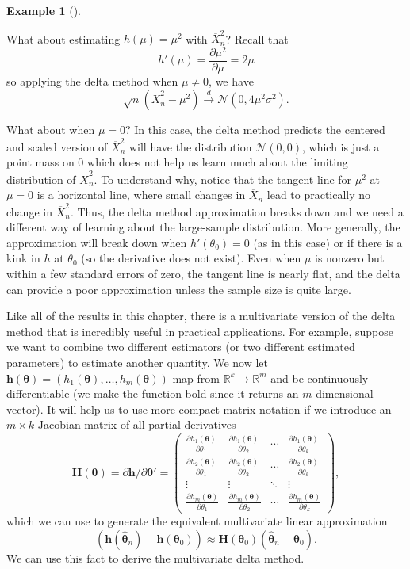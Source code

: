 \documentclass[
  13pt,
  letterpaper,
  DIV=11,
  numbers=noendperiod]{scrreprt}
\newcommand{\mb}{\bm}
\newcommand{\N}{\mathcal{N}}
\newcommand{\Xbar}{\overline{X}}
\newcommand{\indist}{\overset{d}{\to}}
\theoremstyle{plain}
\theoremstyle{plain}
\theoremstyle{definition}
\theoremstyle{definition}
\newtheorem{example}{Example}[chapter]
\theoremstyle{remark}
\begin{document}
\begin{example}[]\protect\hypertarget{exm-squared}{}\label{exm-squared}

What about estimating \(h(\mu) =\mu^2\) with \(\Xbar_n^2\)? Recall that
\[
h'(\mu) = \frac{\partial \mu^2}{\partial \mu} = 2\mu
\] so applying the delta method when \(\mu \neq 0\), we have \[
\sqrt{n}\left(\Xbar_n^2 - \mu^2\right) \indist \N(0, 4\mu^2\sigma^2).
\]

What about when \(\mu = 0\)? In this case, the delta method predicts the
centered and scaled version of \(\Xbar_n^2\) will have the distribution
\(\N(0, 0)\), which is just a point mass on 0 which does not help us
learn much about the limiting distribution of \(\Xbar_n^2\). To
understand why, notice that the tangent line for \(\mu^2\) at
\(\mu = 0\) is a horizontal line, where small changes in \(\Xbar_n\)
lead to practically no change in \(\Xbar_n^2\). Thus, the delta method
approximation breaks down and we need a different way of learning about
the large-sample distribution. More generally, the approximation will
break down when \(h'(\theta_0) = 0\) (as in this case) or if there is a
kink in \(h\) at \(\theta_0\) (so the derivative does not exist). Even
when \(\mu\) is nonzero but within a few standard errors of zero, the
tangent line is nearly flat, and the delta can provide a poor
approximation unless the sample size is quite large.

\end{example}

Like all of the results in this chapter, there is a multivariate version
of the delta method that is incredibly useful in practical applications.
For example, suppose we want to combine two different estimators (or two
different estimated parameters) to estimate another quantity. We now let
\(\mb{h}(\mb{\theta}) = (h_1(\mb{\theta}), \ldots, h_m(\mb{\theta}))\)
map from \(\mathbb{R}^k \to \mathbb{R}^m\) and be continuously
differentiable (we make the function bold since it returns an
\(m\)-dimensional vector). It will help us to use more compact matrix
notation if we introduce an \(m \times k\) Jacobian matrix of all
partial derivatives \[
\mb{H}(\mb{\theta}) = \partial\mb h/\partial\mb\theta' = \begin{pmatrix}
  \frac{\partial h_1(\mb{\theta})}{\partial \theta_1} & \frac{\partial h_1(\mb{\theta})}{\partial \theta_2} & \cdots & \frac{\partial h_1(\mb{\theta})}{\partial \theta_k} \\
  \frac{\partial h_2(\mb{\theta})}{\partial \theta_1} & \frac{\partial h_2(\mb{\theta})}{\partial \theta_2} & \cdots & \frac{\partial h_2(\mb{\theta})}{\partial \theta_k} \\
  \vdots & \vdots & \ddots & \vdots \\
  \frac{\partial h_m(\mb{\theta})}{\partial \theta_1} & \frac{\partial h_m(\mb{\theta})}{\partial \theta_2} & \cdots & \frac{\partial h_m(\mb{\theta})}{\partial \theta_k} 
\end{pmatrix},
\] which we can use to generate the equivalent multivariate linear
approximation \[
\left(\mb{h}(\widehat{\mb{\theta}}_n) - \mb{h}(\mb{\theta}_0)\right) \approx \mb{H}(\mb{\theta}_0)\left(\widehat{\mb{\theta}}_n - \mb{\theta}_0\right).
\] We can use this fact to derive the multivariate delta method.
\end{document}
